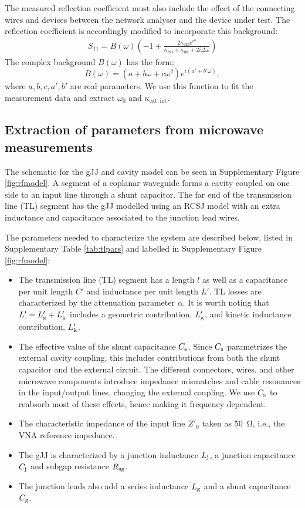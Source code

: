 The measured reflection coefficient must also include the effect of the connecting wires and devices between the network analyser and the device under test.
The reflection coefficient is accordingly modified to incorporate this background:
\begin{eqnarray}
S_{11} = B(\omega)\left(-1 + \frac{2\kappa_\mathrm{ext}e^{i\theta}}{\kappa_\mathrm{ext}+\kappa_\mathrm{int}+2i\Delta\omega}\right)
\end{eqnarray}
The complex background $B(\omega)$ has the form:
\begin{equation}
B(\omega) = (a+b\omega+c\omega^2)e^{i(a'+b'\omega)},
\end{equation}
where $a,b,c,a',b'$ are real parameters.  We use this function to fit the measurement data and extract $\omega_0$ and $\kappa_\mathrm{ext,int}$.

\subsection{Extraction of parameters from microwave measurements}\label{sec:extraction}
\noindent The schematic for the gJJ and cavity model can be seen in Supplementary Figure \ref{fig:rfmodel}.
A segment of a coplanar waveguide forms a cavity coupled on one side to an input line through a shunt capacitor.
The far end of the transmission line (TL) segment has the gJJ modelled using an RCSJ model with an extra inductance and capacitance associated to the junction lead wires.

The parameters needed to characterize the system are described below, listed in Supplementary Table \ref{tab:tlpars} and labelled in Supplementary Figure \ref{fig:rfmodel}:
\begin{itemize}
	\item The transmission line (TL) segment has a length $l$ as well as a capacitance per unit length $C'$ and inductance per unit length $L'$.
	TL losses are characterized by the attenuation parameter $\alpha$.
	It is worth noting that $L' = L'_{\rm g} + L'_{\rm k}$ includes a geometric contribution, $L'_{\rm g}$, and kinetic inductance contribution\cite{vanduzer_principles_1999}, $L'_{\rm k}$.
	\item The effective value of the shunt capacitance $C_{\rm s}$.
	Since $C_{\rm s}$ parametrizes the external cavity coupling, this includes contributions from both the shunt capacitor and the external circuit.
	The different connectors, wires, and other microwave components introduce impedance mismatches and cable resonances in the input/output lines, changing the external coupling.
	We use $C_{\rm s}$ to reabsorb most of these effects, hence making it frequency dependent.
	\item The characteristic impedance of the input line $Z'_0$ taken as \SI{50}{\ohm}, i.e., the VNA reference impedance.
	\item The gJJ is characterized by a junction inductance $L_{\rm j}$, a junction capacitance $C_{\rm j}$ and subgap resistance $R_{\rm sg}$.
	\item The junction leads also add a series inductance $L_{\rm g}$ and a shunt capacitance $C_{\rm g}$.
\end{itemize}

